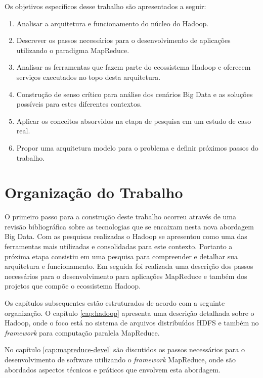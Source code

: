Os objetivos específicos desse trabalho são apresentados a seguir:
 
\begin{enumerate}
  \item Analisar a arquitetura e funcionamento do núcleo do Hadoop.
  \item Descrever os passos necessários para o desenvolvimento de aplicações utilizando o paradigma MapReduce.
  \item Analisar as ferramentas que fazem parte do ecossistema Hadoop e oferecem serviços executados no topo desta arquitetura.
  \item Construção de senso crítico para análise dos cenários Big Data e as soluções possíveis para estes diferentes contextos.
  \item Aplicar os conceitos absorvidos na etapa de pesquisa em um estudo de caso real.
  \item Propor uma arquitetura modelo para o problema e definir próximos passos do trabalho.
\end{enumerate}
 
 
\section{Organização do Trabalho}
 
O primeiro passo para a construção deste trabalho ocorreu através de uma revisão bibliográfica sobre as tecnologias que se encaixam nesta nova abordagem Big Data. Com as pesquisas realizadas o Hadoop se apresentou como uma das ferramentas mais utilizadas e consolidadas para este contexto. Portanto a próxima etapa consistiu em uma pesquisa para compreender e detalhar sua arquitetura e funcionamento. Em seguida foi realizada uma descrição dos passos necessários para o desenvolvimento para aplicações MapReduce e também dos projetos que compõe o ecossistema Hadoop.

Os capítulos subsequentes estão estruturados de acordo com a seguinte organização. O capítulo \ref{cap:hadoop} apresenta uma descrição detalhada sobre o Hadoop, onde o foco está no sistema de arquivos distribuídos HDFS e também no \textit{framework} para computação paralela MapReduce. 

No capítulo \ref{cap:mapreduce-devel} são discutidos os passos necessários para o desenvolvimento de software utilizando o \textit{framework} MapReduce, onde são abordados aspectos técnicos e práticos que envolvem esta abordagem.


